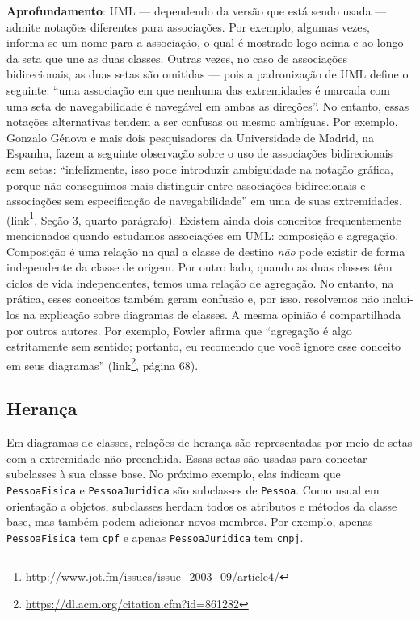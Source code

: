 \documentclass[
  11pt,
  twoside]{book}
\newcommand{\passthrough}[1]{#1}
\DeclareRobustCommand{\href}[2]{#2\footnote{\url{#1}}}
\newenvironment{esmbox}{\centering \vspace{1.5ex} \begin{tcolorbox}[breakable, colback=backcolor, width=4.9in]}{\end{tcolorbox} \vspace{1.5ex}}
\begin{document}
\begin{esmbox}

\textbf{Aprofundamento}: UML --- dependendo da versão que está sendo
usada --- admite notações diferentes para associações. Por exemplo,
algumas vezes, informa-se um nome para a associação, o qual é mostrado
logo acima e ao longo da seta que une as duas classes. Outras vezes, no
caso de associações bidirecionais, as duas setas são omitidas --- pois a
padronização de UML define o seguinte: ``uma associação em que nenhuma
das extremidades é marcada com uma seta de navegabilidade é navegável em
ambas as direções''. No entanto, essas notações alternativas tendem a
ser confusas ou mesmo ambíguas. Por exemplo, Gonzalo Génova e mais dois
pesquisadores da Universidade de Madrid, na Espanha, fazem a seguinte
observação sobre o uso de associações bidirecionais sem setas:
``infelizmente, isso pode introduzir ambiguidade na notação gráfica,
porque não conseguimos mais distinguir entre associações bidirecionais e
associações sem especificação de navegabilidade'' em uma de suas
extremidades.
(\href{http://www.jot.fm/issues/issue_2003_09/article4/}{link}, Seção 3,
quarto parágrafo). Existem ainda dois conceitos frequentemente
mencionados quando estudamos associações em UML: composição e agregação.
Composição é uma relação na qual a classe de destino \emph{não} pode
existir de forma independente da classe de origem. Por outro lado,
quando as duas classes têm ciclos de vida independentes, temos uma
relação de agregação. No entanto, na prática, esses conceitos também
geram confusão e, por isso, resolvemos não incluí-los na explicação
sobre diagramas de classes. A mesma opinião é compartilhada por outros
autores. Por exemplo, Fowler afirma que ``agregação é algo estritamente
sem sentido; portanto, eu recomendo que você ignore esse conceito em
seus diagramas''
(\href{https://dl.acm.org/citation.cfm?id=861282}{link}, página 68).

\end{esmbox}

\hypertarget{heranuxe7a}{%
\subsection{Herança}\label{heranuxe7a}}


Em diagramas de classes, relações de herança são representadas por meio
de setas com a extremidade não preenchida. Essas setas são usadas para
conectar subclasses à sua classe base. No próximo exemplo, elas indicam
que \passthrough{\lstinline!PessoaFisica!} e
\passthrough{\lstinline!PessoaJuridica!} são subclasses de
\passthrough{\lstinline!Pessoa!}. Como usual em orientação a objetos,
subclasses herdam todos os atributos e métodos da classe base, mas
também podem adicionar novos membros. Por exemplo, apenas
\passthrough{\lstinline!PessoaFisica!} tem \passthrough{\lstinline!cpf!}
e apenas \passthrough{\lstinline!PessoaJuridica!} tem
\passthrough{\lstinline!cnpj!}.
\end{document}
